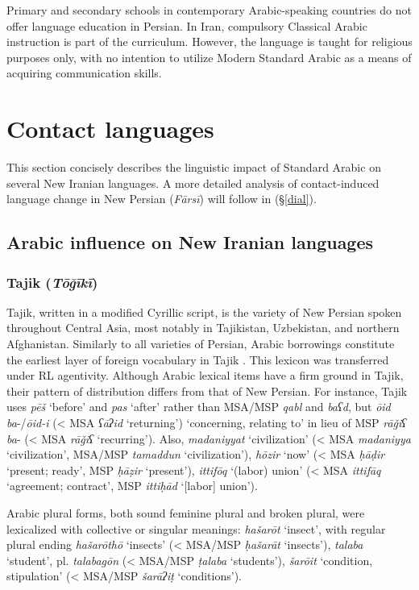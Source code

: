 \documentclass[output=paper]{langsci/langscibook}
\begin{document}
Primary and secondary schools in contemporary Arabic-speaking countries do not offer language education in Persian. In Iran, compulsory Classical Arabic instruction is part of the curriculum. However, the language is taught for religious purposes only, with no intention to utilize Modern Standard Arabic as a means of acquiring communication skills.

\section{Contact languages}

This section concisely describes the linguistic impact of Standard Arabic on several New Iranian languages. A more detailed analysis of contact-induced language change in New Persian (\textit{Fārsī}) will follow in (§\ref{dial}).

\subsection{Arabic influence on New Iranian languages}

\subsubsection{Tajik (\textit{Tōǧīkī})}

Tajik, written in a modified Cyrillic script, is the variety of New Persian spoken throughout Central Asia, most notably in Tajikistan, Uzbekistan, and northern Afghanistan. Similarly to all varieties of Persian, Arabic borrowings constitute the earliest layer of foreign vocabulary in Tajik \citep{Perry2009}. This lexicon was transferred under RL agentivity. Although Arabic lexical items have a firm ground in Tajik, their pattern of distribution differs from that of New Persian. For instance, Tajik uses \textit{pēš} ‘before’ and \textit{pas} ‘after’ rather than MSA/MSP \textit{qabl} and \textit{baʕd}, but \textit{ōid} \textit{ba}{}-/\textit{ōid-i} (< MSA \textit{ʕāʔid} ‘returning’) ‘concerning, relating to’ in lieu of MSP \textit{rāǧiʕ} \textit{ba}{}- (< MSA \textit{rāǧiʕ} ‘recurring’). Also, \textit{madaniyyat} ‘civilization’ (< MSA \textit{madaniyya} ‘civilization’, MSA/MSP \textit{tamaddun} ‘civilization’), \textit{hōzir} ‘now’ (< MSA \textit{ḥāḍir} ‘present; ready’, MSP \textit{ḥāẓir} ‘present’), \textit{ittifōq} ‘(labor) union’ (< MSA \textit{ittifāq} ‘agreement; contract’, MSP \textit{ittiḥād} ‘[labor] union’).

Arabic plural forms, both sound feminine plural and broken plural, were lexicalized with collective or singular meanings: \textit{hašarōt} ‘insect’, with regular plural ending \textit{hašarōthō} ‘insects’ (< MSA/MSP \textit{ḥašarāt} ‘insects’), \textit{talaba} ‘student’, pl. \textit{talabagōn} (< MSA/MSP \textit{ṭalaba} ‘students’), \textit{šarōit} ‘condition, stipulation’ (< MSA/MSP \textit{šarāʔiṭ} ‘conditions’).
\end{document}
